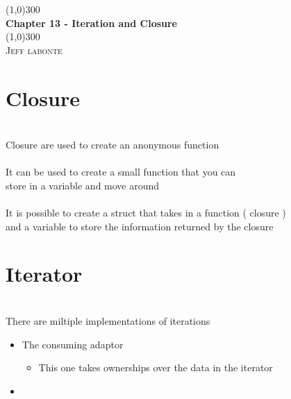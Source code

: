 \documentclass{article}
\begin{document}
  \begin{titlepage}
    \begin{center}
      \line(1,0){300} \\
      [0.25in]
      \huge{\bfseries Chapter 13 - Iteration and Closure}\\
      [2mm]
      \line(1,0){300}\\
      [1.5cm]
      \textsc{\LARGE Jeff labonte}\\
      [0.75cm]
    \end{center}
  \end{titlepage}
 \section {Closure}
 \ \\[2mm]
 Closure are used to create an anonymous function \\
 \ \\[2mm]
 It can be used to create a small function  that you can \\
 store in a variable and move around\\
 \ \\[2mm]
 It is possible to create a struct that takes in a function ( closure ) \\
 and a variable to store the information returned by the closure \\
 \section{Iterator}
 \ \\[2mm]
 There are miltiple implementations of iterations \\
 \begin{itemize}
     \item The consuming adaptor
         \begin{itemize}
             \item This one takes ownerships over the data in the iterator 
         \end{itemize}
     \item 
 \end{itemize}
\end{document}

